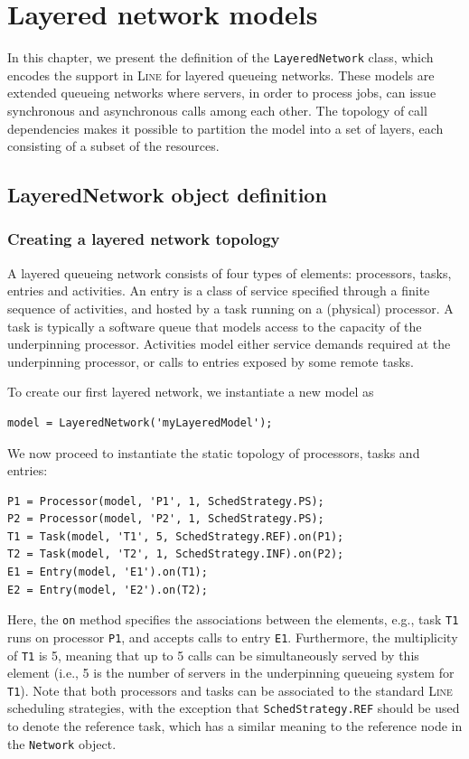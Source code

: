 \chapter{Layered network models}
\label{Layered-network-models}
In this chapter, we present the definition of the \texttt{LayeredNetwork} class, which encodes the support in \textsc{Line} for layered queueing networks. These models are extended queueing networks where servers, in order to process jobs, can issue synchronous and asynchronous calls among each other. The topology of call dependencies makes it possible to partition the model into a set of layers, each consisting of a subset of the resources. %

\section{LayeredNetwork object definition}
\label{layerednetwork-object-definition}
\subsection{Creating a layered network topology}
A layered queueing network consists of four types of elements: processors, tasks, entries and activities. An entry is a class of service specified through a finite sequence of activities, and hosted by a task running on a (physical) processor. A task is typically a software queue that models access to the capacity of the underpinning processor. Activities model either service demands required at the underpinning processor, or calls to entries exposed by some remote tasks.

To create our first layered network, we instantiate a new model as
\begin{lstlisting}
model = LayeredNetwork('myLayeredModel');
\end{lstlisting}
We now proceed to instantiate the static topology of processors, tasks and entries:
\begin{lstlisting}
P1 = Processor(model, 'P1', 1, SchedStrategy.PS);
P2 = Processor(model, 'P2', 1, SchedStrategy.PS);
T1 = Task(model, 'T1', 5, SchedStrategy.REF).on(P1);
T2 = Task(model, 'T2', 1, SchedStrategy.INF).on(P2);
E1 = Entry(model, 'E1').on(T1);
E2 = Entry(model, 'E2').on(T2);
\end{lstlisting}
Here, the \texttt{on} method specifies the associations between the elements, e.g., task \texttt{T1} runs on processor \texttt{P1}, and accepts calls to entry \texttt{E1}. Furthermore, the multiplicity of \texttt{T1} is 5, meaning that up to 5 calls can be simultaneously served by this element (i.e., 5 is the number of servers in the underpinning queueing system for \texttt{T1}). Note that both processors and tasks can be associated to the standard \textsc{Line} scheduling strategies, with the exception that \texttt{SchedStrategy.REF} should be used to denote the reference task, which has a similar meaning to the reference node in the \texttt{Network} object.

